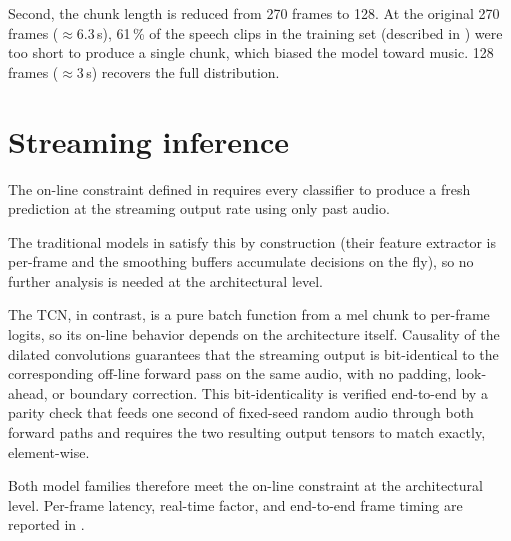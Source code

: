 Second, the chunk length is reduced from 270 frames to 128.
At the original 270 frames ($\approx 6.3$\,s), 61\,\% of the speech clips in the training set (described in ) were too short to produce a single chunk, which biased the model toward music.
128 frames ($\approx 3$\,s) recovers the full distribution.

\section{Streaming inference}
\label{sec:streaming_inference}

The on-line constraint defined in  requires every classifier to produce a fresh prediction at the streaming output rate using only past audio.

The traditional models in  satisfy this by construction (their feature extractor is per-frame and the smoothing buffers accumulate decisions on the fly), so no further analysis is needed at the architectural level.

The TCN, in contrast, is a pure batch function from a mel chunk to per-frame logits, so its on-line behavior depends on the architecture itself.
Causality of the dilated convolutions guarantees that the streaming output is bit-identical to the corresponding off-line forward pass on the same audio, with no padding, look-ahead, or boundary correction.
This bit-identicality is verified end-to-end by a parity check that feeds one second of fixed-seed random audio through both forward paths and requires the two resulting output tensors to match exactly, element-wise.

Both model families therefore meet the on-line constraint at the architectural level.
Per-frame latency, real-time factor, and end-to-end frame timing are reported in .
